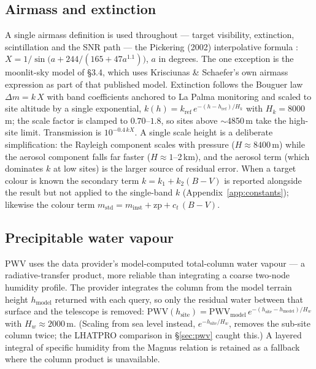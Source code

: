 \documentclass[11pt]{article}
\begin{document}
\subsection{Airmass and extinction}
A single airmass definition is used throughout --- target visibility, extinction,
scintillation and the SNR path --- the Pickering (2002) interpolative formula
\cite{pickering}: $X = 1/\sin\!\big(a + 244/(165+47a^{1.1})\big)$, $a$ in degrees. The
one exception is the moonlit-sky model of \S3.4, which uses Krisciunas \& Schaefer's
own airmass expression as part of that published model. Extinction follows the
Bouguer law $\Delta m = k\,X$ with band coefficients anchored to La Palma monitoring
\cite{king} and scaled to site altitude by a single exponential,
$k(h) = k_{\text{ref}}\,e^{-(h - h_{\text{ref}})/H_k}$ with $H_k = 8000$\,m; the scale
factor is clamped to $0.70$--$1.8$, so sites above $\sim$4850\,m take the high-site
limit. Transmission is $10^{-0.4\,k X}$. A single scale height is a deliberate
simplification: the Rayleigh component scales with pressure ($H\approx8400$\,m) while
the aerosol component falls far faster ($H\approx1$--2\,km), and the aerosol term
(which dominates $k$ at low sites) is the larger source of residual error. When a
target colour is known the secondary term $k = k_1 + k_2(B\!-\!V)$ is reported
alongside the result but not applied to the single-band $k$
(Appendix~\ref{app:constants}); likewise the colour term
$m_{\text{std}} = m_{\text{inst}} + \text{zp} + c_t\,(B\!-\!V)$.

\subsection{Precipitable water vapour}
PWV uses the data provider's model-computed total-column water vapour --- a
radiative-transfer product, more reliable than integrating a coarse two-node humidity
profile. The provider integrates the column from the model terrain height
$h_{\text{model}}$ returned with each query, so only the residual water between that
surface and the telescope is removed: $\mathrm{PWV}(h_{\text{site}}) =
\mathrm{PWV}_{\text{model}}\, e^{-(h_{\text{site}}-h_{\text{model}})/H_w}$ with
$H_w \approx 2000$\,m. (Scaling from sea level instead, $e^{-h_{\text{site}}/H_w}$,
removes the sub-site column twice; the LHATPRO comparison in \S\ref{sec:pwv} caught
this.) A layered integral of specific humidity from the Magnus relation \cite{magnus}
is retained as a fallback where the column product is unavailable.
\end{document}
